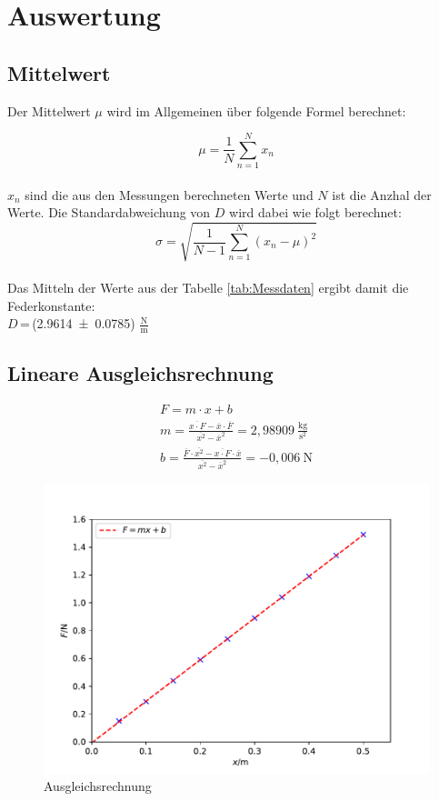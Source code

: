 \section{Auswertung}
\label{sec:Auswertung}

\subsection{Mittelwert}

Der Mittelwert $\mu$ wird im Allgemeinen über folgende Formel berechnet:

\begin{equation}
    \mu = \frac{1}{N} \sum_{n=1}^{N} x_n
\end{equation}
\\
$x_n$ sind die aus den Messungen berechneten Werte und $N$ ist die Anzhal der Werte. Die Standardabweichung von $D$ 
wird dabei wie folgt berechnet:
\\
\begin{equation}
    \sigma = \sqrt{\frac{1}{N-1}\sum_{n=1}^{N} (x_n -\mu)^2}
\end{equation}
\\
Das Mitteln der Werte aus der Tabelle \ref{tab:Messdaten} ergibt damit die Federkonstante:
\\
$D$\,=\,(\num{2,9614+-0,0785})  $\frac{\si{\newton}}{\si{\meter}}$

\subsection{Lineare Ausgleichsrechnung}


    \begin{gather}
        F= m \cdot x + b \\ 
        m= \frac{\overline{x\cdot F}-\overline{x}\cdot \overline{F}}{\overline{x^2}-\overline{x}^2}=2,98909 \: \frac{\si{\kg}}{\si{\s}^2} \\ 
        b= \frac{\overline{F}\cdot \overline{x^2}-\overline{x\cdot F}\cdot \overline{x}}{\overline{x^2}-\overline{x}^2}=-0,006 \: \si{\N}
    \end{gather}


\begin{figure}
    \centering
    \includegraphics[width=\textwidth]{Python_dateien/Plot_Ausgleichsrechnung.pdf}
    \caption{Ausgleichsrechnung}
\end{figure}


